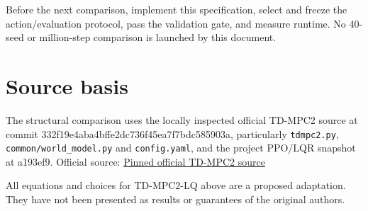 \documentclass[11pt]{article}
\begin{document}
Before the next comparison, implement this specification, select and freeze the action/evaluation protocol, pass the validation gate, and measure runtime. No 40-seed or million-step comparison is launched by this document.

\section{Source basis}

The structural comparison uses the locally inspected official TD-MPC2 source at commit 332f19e4aba4bffe2dc736f45ea7f7bdc585903a, particularly \texttt{tdmpc2.py}, \texttt{common/world\_model.py} and \texttt{config.yaml}, and the project PPO/LQR snapshot at a193ef9. Official source: \href{https://github.com/nicklashansen/tdmpc2/tree/332f19e4aba4bffe2dc736f45ea7f7bdc585903a}{Pinned official TD-MPC2 source}

All equations and choices for TD-MPC2-LQ above are a proposed adaptation. They have not been presented as results or guarantees of the original authors.
\end{document}
